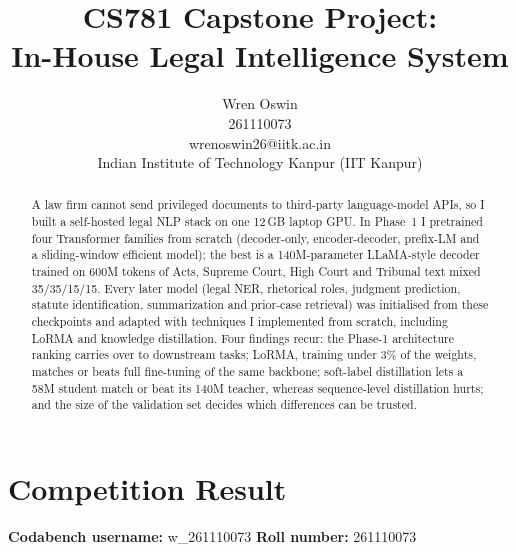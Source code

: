 \documentclass[11pt, oneside]{article}
\title{CS781 Capstone Project:\\
In-House Legal Intelligence System}
\author{
    Wren Oswin  \\
    261110073 \\
    wrenoswin26@iitk.ac.in\\
    Indian Institute of Technology Kanpur (IIT Kanpur)
}
\date{}
\begin{document}
\maketitle
\begin{abstract}
A law firm cannot send privileged documents to third-party language-model APIs, so I built a self-hosted legal NLP
stack on one 12\,GB laptop GPU. In Phase~1 I pretrained four Transformer families from scratch (decoder-only,
encoder-decoder, prefix-LM and a sliding-window efficient model); the best is a 140M-parameter LLaMA-style decoder
trained on 600M tokens of Acts, Supreme Court, High Court and Tribunal text mixed 35/35/15/15. Every later model
(legal NER, rhetorical roles, judgment prediction, statute identification, summarization and prior-case retrieval)
was initialised from these checkpoints and adapted with techniques I implemented from scratch, including LoRMA and
knowledge distillation. Four findings recur: the Phase-1 architecture ranking carries over to downstream tasks;
LoRMA, training under 3\% of the weights, matches or beats full fine-tuning of the same backbone; soft-label
distillation lets a 58M student match or beat its 140M teacher, whereas sequence-level distillation hurts; and the
size of the validation set decides which differences can be trusted.
\end{abstract}

\section{Competition Result}
\noindent
\textbf{Codabench username:} w\_261110073
\hfill
\textbf{Roll number:} 261110073
\medskip
\end{document}
